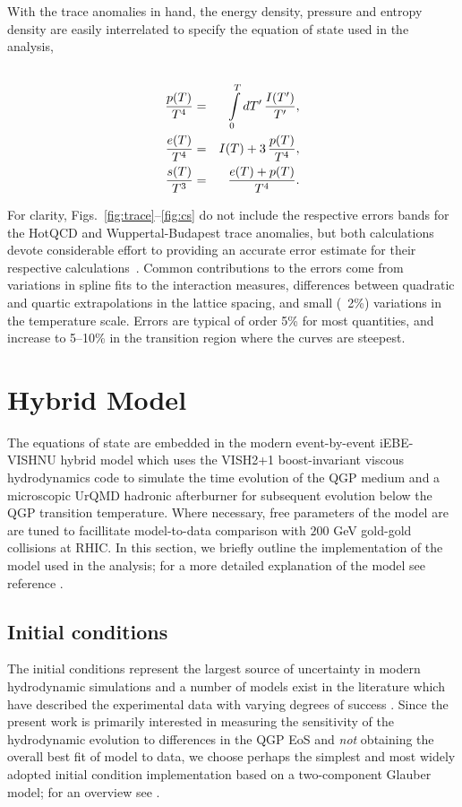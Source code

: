 \documentclass[aps,prc,reprint,amsmath,nofootinbib,superscriptaddress]{revtex4-1}
\begin{document}
With the trace anomalies in hand, the energy density, pressure and entropy density are easily interrelated to specify the equation of state used in the analysis,
\begin{eqnarray}
 \label{conversion}
 \cr \frac{p(T)}{T^4} &=& \int\limits_0^T dT'\, \frac{I(T')}{T'}, \\
 \frac{e(T)}{T^4} &=& I(T) + 3\, \frac{p(T)}{T^4}, \\
 \frac{s(T)}{T^3} &=& \frac{e(T) + p(T)}{T^4}. 
\end{eqnarray}
 
For clarity, Figs.~\ref{fig:trace}--\ref{fig:cs} do not include the respective errors bands for the HotQCD and Wuppertal-Budapest trace anomalies, but both calculations devote considerable effort
to providing an accurate error estimate for their respective calculations~\cite{Borsanyi:2013bia,Bazavov:2014pvz}.  Common contributions to the errors
come from variations in spline fits to the interaction measures, differences between quadratic and quartic extrapolations in the lattice spacing, and
small (~2\%) variations in the temperature scale.  Errors are typical of order 5\% for most quantities, and increase to 5--10\% in the transition region
where the curves are steepest.


\section{Hybrid Model}

The equations of state are embedded in the modern event-by-event iEBE-VISHNU hybrid model which uses the VISH2+1 boost-invariant viscous hydrodynamics code to simulate the 
time evolution of the QGP medium and a microscopic UrQMD hadronic afterburner for subsequent evolution below the QGP transition temperature. Where necessary, free
parameters of the model are are tuned to facillitate model-to-data comparison with $200$ GeV gold-gold collisions at RHIC. In this section, we briefly outline
the implementation of the model used in the analysis; for a more detailed explanation of the model see reference \cite{Shen:2014vra}. 

\subsection{Initial conditions}
\label{initial_condition}

The initial conditions represent the largest source of uncertainty in modern hydrodynamic simulations and a number of models exist in the literature which have described
the experimental data with varying degrees of success \cite{Schenke:2012wb, Niemi:2015qia, Chatterjee:2015aja, Moreland:2014oya, Drescher:2006pi, Adler:2013aqf}. Since the present work is primarily interested in measuring the sensitivity of the hydrodynamic evolution to differences in the QGP EoS and \emph{not} obtaining the overall best fit of model to data, we choose perhaps the simplest and most widely adopted initial condition implementation based on a two-component Glauber model; for an overview see \cite{Miller:2007ri}.
\end{document}

